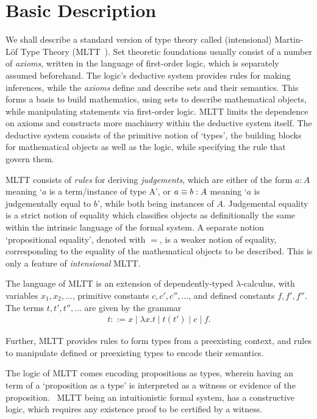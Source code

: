 \section{Basic Description}

We shall describe a standard version of type theory called (intensional) Martin-L\"of Type Theory (MLTT~\cite{martin1975intuitionistic}). 
Set theoretic foundations usually consist of a number of \textit{axioms}, written in the language of 
first-order logic, which is separately assumed beforehand. The logic's deductive system provides rules for making  
inferences, while the \textit{axioms} define and describe sets and
their semantics. This forms a basis to build mathematics, using sets to describe mathematical
objects, while manipulating statements via first-order logic.
MLTT limits the dependence on axioms and constructs more machinery within the deductive system itself. The
deductive system consists of the primitive notion of `types', the building blocks
for mathematical objects as well as the logic, while specifying the rule that govern them. 

MLTT consists of \textit{rules} for deriving \textit{judgements}, which are either of the form
$ a : A$ meaning `$a$ is a term/instance of type A', or $a \equiv b : A$ meaning `$a$ is judgementally equal to $b$',
while both being instances of $A$.
Judgemental equality is a strict notion of equality which classifies objects as definitionally
the same within the intrinsic language of the formal system.
A separate notion `propositional equality', denoted with $=$, is a weaker notion of equality, corresponding
to the equality of the mathematical objects to be described. This is only a feature of \emph{intensional} MLTT.

The language of MLTT is an extension of dependently-typed $\lambda$-calculus, with variables
$x_1, x_2, \ldots$, primitive constants $c, c', c'', \ldots$, and defined constants $f, f', f''$.
The terms $t, t', t'', \ldots$ are given by the grammar 
\begin{align*}
  t ::= x \mid \lambda x.t \mid t(t') \mid  c \mid f.
\end{align*}

Further, MLTT provides rules to form types from a preexisting context, and rules to manipulate defined or preexisting types 
to encode their semantics.

The logic of MLTT comes encoding propositions as types, wherein having an term of a `proposition as a type'
is interpreted as a witness or evidence of the proposition.~\cite{awodey2004propositions} MLTT being an intuitionistic formal system, has a constructive
logic, which requires any existence proof to be certified by a witness. ~\cite{martin1975intuitionistic}

